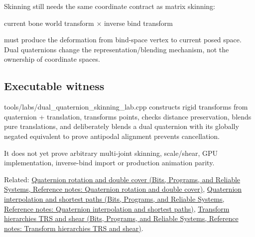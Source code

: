 Skinning still needs the same coordinate contract as matrix skinning:

current bone world transform × inverse bind transform

must produce the deformation from bind-space vertex to current posed space. Dual quaternions change the representation/blending mechanism, not the ownership of coordinate spaces.

\subsection{Executable witness}\label{appendix-921f3f2efb53-executable-witness}

tools/labs/dual\_quaternion\_skinning\_lab.cpp constructs rigid transforms from quaternion + translation, transforms points, checks distance preservation, blends pure translations, and deliberately blends a dual quaternion with its globally negated equivalent to prove antipodal alignment prevents cancellation.

It does not yet prove arbitrary multi-joint skinning, scale/shear, GPU implementation, inverse-bind import or production animation parity.

Related: \href{../01-Bits-Programs-and-Reliable-Systems/main.pdf\#nameddest=appendix-8e61ab68f6b2}{Quaternion rotation and double cover (Bits, Programs, and Reliable Systems, Reference notes: Quaternion rotation and double cover)}, \href{../01-Bits-Programs-and-Reliable-Systems/main.pdf\#nameddest=appendix-9b4b8254f26b}{Quaternion interpolation and shortest paths (Bits, Programs, and Reliable Systems, Reference notes: Quaternion interpolation and shortest paths)}, \href{../01-Bits-Programs-and-Reliable-Systems/main.pdf\#nameddest=appendix-292c061cd47c}{Transform hierarchies TRS and shear (Bits, Programs, and Reliable Systems, Reference notes: Transform hierarchies TRS and shear)}.
